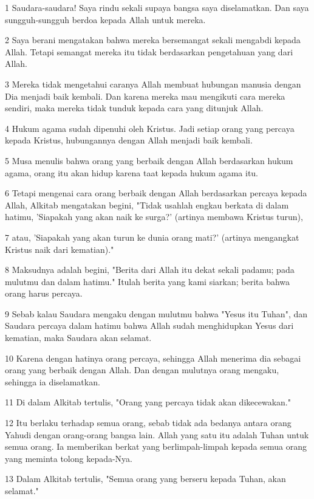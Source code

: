 \par 1 Saudara-saudara! Saya rindu sekali supaya bangsa saya diselamatkan. Dan saya sungguh-sungguh berdoa kepada Allah untuk mereka.
\par 2 Saya berani mengatakan bahwa mereka bersemangat sekali mengabdi kepada Allah. Tetapi semangat mereka itu tidak berdasarkan pengetahuan yang dari Allah.
\par 3 Mereka tidak mengetahui caranya Allah membuat hubungan manusia dengan Dia menjadi baik kembali. Dan karena mereka mau mengikuti cara mereka sendiri, maka mereka tidak tunduk kepada cara yang ditunjuk Allah.
\par 4 Hukum agama sudah dipenuhi oleh Kristus. Jadi setiap orang yang percaya kepada Kristus, hubungannya dengan Allah menjadi baik kembali.
\par 5 Musa menulis bahwa orang yang berbaik dengan Allah berdasarkan hukum agama, orang itu akan hidup karena taat kepada hukum agama itu.
\par 6 Tetapi mengenai cara orang berbaik dengan Allah berdasarkan percaya kepada Allah, Alkitab mengatakan begini, "Tidak usahlah engkau berkata di dalam hatimu, 'Siapakah yang akan naik ke surga?' (artinya membawa Kristus turun),
\par 7 atau, 'Siapakah yang akan turun ke dunia orang mati?' (artinya mengangkat Kristus naik dari kematian)."
\par 8 Maksudnya adalah begini, "Berita dari Allah itu dekat sekali padamu; pada mulutmu dan dalam hatimu." Itulah berita yang kami siarkan; berita bahwa orang harus percaya.
\par 9 Sebab kalau Saudara mengaku dengan mulutmu bahwa "Yesus itu Tuhan", dan Saudara percaya dalam hatimu bahwa Allah sudah menghidupkan Yesus dari kematian, maka Saudara akan selamat.
\par 10 Karena dengan hatinya orang percaya, sehingga Allah menerima dia sebagai orang yang berbaik dengan Allah. Dan dengan mulutnya orang mengaku, sehingga ia diselamatkan.
\par 11 Di dalam Alkitab tertulis, "Orang yang percaya tidak akan dikecewakan."
\par 12 Itu berlaku terhadap semua orang, sebab tidak ada bedanya antara orang Yahudi dengan orang-orang bangsa lain. Allah yang satu itu adalah Tuhan untuk semua orang. Ia memberikan berkat yang berlimpah-limpah kepada semua orang yang meminta tolong kepada-Nya.
\par 13 Dalam Alkitab tertulis, "Semua orang yang berseru kepada Tuhan, akan selamat."
